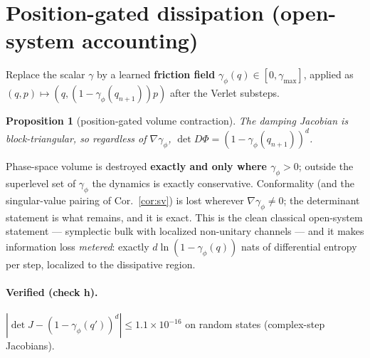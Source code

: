 \documentclass[11pt]{article}
\theoremstyle{plain}
\newtheorem{proposition}{Proposition}
\theoremstyle{definition}
\begin{document}
\section{Position-gated dissipation (open-system accounting)}
Replace the scalar $\gamma$ by a learned \textbf{friction field} $\gamma_\phi(q)\in[0,\gamma_{\max}]$, applied as $(q,p)\mapsto(q,(1-\gamma_\phi(q_{n+1}))p)$ after the Verlet substeps.
\begin{proposition}[position-gated volume contraction]\label{prop:gated}
The damping Jacobian is block-triangular, so regardless of $\nabla\gamma_\phi$, $\det D\Phi=(1-\gamma_\phi(q_{n+1}))^d$.
\end{proposition}
Phase-space volume is destroyed \textbf{exactly and only where $\gamma_\phi>0$}; outside the superlevel set of $\gamma_\phi$ the dynamics is exactly conservative. Conformality (and the singular-value pairing of Cor.~\ref{cor:sv}) is lost wherever $\nabla\gamma_\phi\ne0$; the determinant statement is what remains, and it is exact. This is the clean classical open-system statement --- symplectic bulk with localized non-unitary channels --- and it makes information loss \emph{metered}: exactly $d\ln(1-\gamma_\phi(q))$ nats of differential entropy per step, localized to the dissipative region.
\paragraph{Verified (check h).} $|\det J-(1-\gamma_\phi(q'))^d|\le1.1\times10^{-16}$ on random states (complex-step Jacobians).
\end{document}
